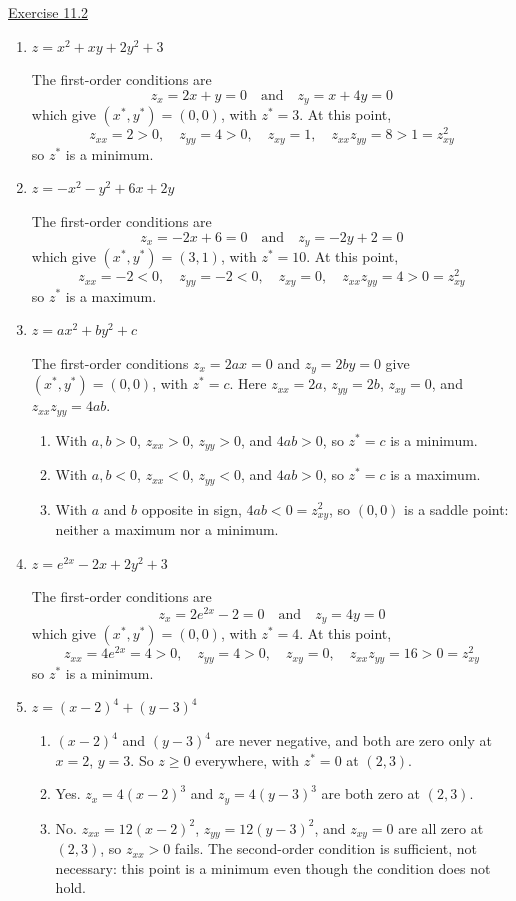 \underline{Exercise 11.2}
\begin{enumerate}
\item[1.] $z = x^{2} + xy + 2y^{2} + 3$

The first-order conditions are
\[z_x = 2x + y = 0 \quad\text{and}\quad z_y = x + 4y = 0\]
which give $(x^{*}, y^{*}) = (0, 0)$, with $z^{*} = 3$. At this point,
\[z_{xx} = 2 > 0, \quad z_{yy} = 4 > 0, \quad z_{xy} = 1, \quad z_{xx} z_{yy} = 8 > 1 = z_{xy}^{2}\]
so $z^{*}$ is a minimum.

\item[2.] $z = -x^{2} - y^{2} + 6x + 2y$

The first-order conditions are
\[z_x = -2x + 6 = 0 \quad\text{and}\quad z_y = -2y + 2 = 0\]
which give $(x^{*}, y^{*}) = (3, 1)$, with $z^{*} = 10$. At this point,
\[z_{xx} = -2 < 0, \quad z_{yy} = -2 < 0, \quad z_{xy} = 0, \quad z_{xx} z_{yy} = 4 > 0 = z_{xy}^{2}\]
so $z^{*}$ is a maximum.

\item[3.] $z = ax^{2} + by^{2} + c$

The first-order conditions $z_x = 2ax = 0$ and $z_y = 2by = 0$ give $(x^{*}, y^{*}) = (0, 0)$, with $z^{*} = c$. Here $z_{xx} = 2a$, $z_{yy} = 2b$, $z_{xy} = 0$, and $z_{xx} z_{yy} = 4ab$.
\begin{enumerate}
\item[(a)] With $a, b > 0$, $z_{xx} > 0$, $z_{yy} > 0$, and $4ab > 0$, so $z^{*} = c$ is a minimum.
\item[(b)] With $a, b < 0$, $z_{xx} < 0$, $z_{yy} < 0$, and $4ab > 0$, so $z^{*} = c$ is a maximum.
\item[(c)] With $a$ and $b$ opposite in sign, $4ab < 0 = z_{xy}^{2}$, so $(0, 0)$ is a saddle point: neither a maximum nor a minimum.
\end{enumerate}

\item[4.] $z = e^{2x} - 2x + 2y^{2} + 3$

The first-order conditions are
\[z_x = 2e^{2x} - 2 = 0 \quad\text{and}\quad z_y = 4y = 0\]
which give $(x^{*}, y^{*}) = (0, 0)$, with $z^{*} = 4$. At this point,
\[z_{xx} = 4e^{2x} = 4 > 0, \quad z_{yy} = 4 > 0, \quad z_{xy} = 0, \quad z_{xx} z_{yy} = 16 > 0 = z_{xy}^{2}\]
so $z^{*}$ is a minimum.

\item[5.] $z = (x-2)^{4} + (y-3)^{4}$
\begin{enumerate}
\item[(a)] $(x-2)^{4}$ and $(y-3)^{4}$ are never negative, and both are zero only at $x = 2$, $y = 3$. So $z \geq 0$ everywhere, with $z^{*} = 0$ at $(2, 3)$.
\item[(b)] Yes. $z_x = 4(x-2)^{3}$ and $z_y = 4(y-3)^{3}$ are both zero at $(2, 3)$.
\item[(c)] No. $z_{xx} = 12(x-2)^{2}$, $z_{yy} = 12(y-3)^{2}$, and $z_{xy} = 0$ are all zero at $(2, 3)$, so $z_{xx} > 0$ fails. The second-order condition is sufficient, not necessary: this point is a minimum even though the condition does not hold.
\end{enumerate}

\end{enumerate}
